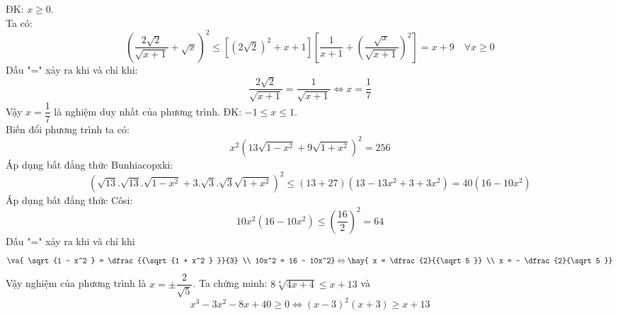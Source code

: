 \lgi
ĐK: $x\geq 0$.\\
Ta có:  
$$\left( {\dfrac{{2\sqrt 2 }}{{\sqrt {x + 1} }} + \sqrt x } \right)^2 \le \left[ {\left( {2\sqrt 2 } \right)^2 + x + 1} \right]\left[ {\dfrac{1}{{x + 1}} + \left( {\dfrac{{\sqrt x }}{{\sqrt {x + 1} }}} \right)^2 } \right] = x + 9 \quad \forall x \geq 0$$
Dấu "=" xảy ra khi và chỉ khi: $$\dfrac{{2\sqrt 2 }}{{\sqrt {x + 1} }} = \dfrac{1}{{\sqrt {x + 1} }} \Leftrightarrow x = \dfrac{1}{7}$$
Vậy $x = \dfrac{1}{7}$ là nghiệm duy nhất của phương trình.
\lgi
ĐK: $ - 1 \le x \le 1$.\\
Biến đổi phương trình ta có:  $$x^2 \left( {13\sqrt {1 - x^2 } + 9\sqrt {1 + x^2 } } \right)^2 = 256$$
Áp dụng bất đẳng thức Bunhiacopxki: 
$$\left( {\sqrt {13} .\sqrt {13} .\sqrt {1 - x^2 } + 3.\sqrt 3 .\sqrt 3 \sqrt {1 + x^2 } } \right)^2 \le \left( {13 + 27} \right)\left( {13 - 13x^2 + 3 + 3x^2 } \right) = 40\left( {16 - 10x^2 } \right)$$
Áp dụng bất đẳng thức Côsi: $$10x^2 \left( {16 - 10x^2 } \right) \le \left( {\dfrac{{16}}{2}} \right)^2 = 64$$
Dấu "=" xảy ra khi và chỉ khi
$$\va{ \sqrt {1 - x^2 } = \dfrac{{\sqrt {1 + x^2 } }}{3} \\ 
 10x^2 = 16 - 10x^2} \Leftrightarrow \hay{
 x = \dfrac{2}{{\sqrt 5 }} \\ 
 x = - \dfrac{2}{\sqrt 5 }}$$
 Vậy nghiệm của phương trình là $x=\pm \dfrac{2}{\sqrt 5 }$.
\hda
Ta chứng minh: $8\sqrt[4]{{4x + 4}} \le x + 13$ và $$x^3 - 3x^2 - 8x + 40 \ge 0 \Leftrightarrow \left( {x - 3} \right)^2 \left( {x + 3} \right) \ge x + 13$$
